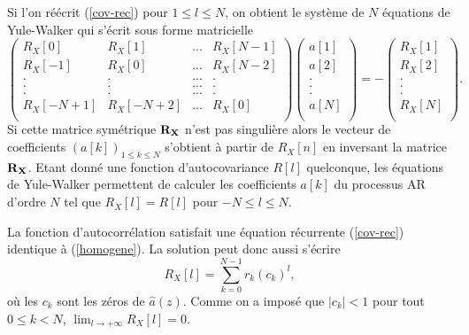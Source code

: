 Si l'on r\'e\'ecrit (\ref{cov-rec}) pour $ 1 \leq l \leq N$, on
obtient le syst\`eme de $N$ \'equations 
de Yule-Walker qui s'\'ecrit sous forme matricielle
\begin{equation}
\label{yule-walker}
\left( \begin{array}{cccc}
R_X[0] &R_X[1] & ...&R_X[N-1] \\
R_X[-1]&R_X[0]& ...&R_X[N-2]\\
. &. &...&.  \\
.&.&...&.\\
.&.&...&.\\
R_X[-N+1]&R_X[-N+2]&...&R_X[0]\\
\end{array}
\right)
\left( \begin{array}{c}
a[1]\\
a[2]\\
.\\
.\\
.\\
a[N]\\
\end{array}
\right)
= -
\left( \begin{array}{c}
R_X[1]\\
R_X[2]\\
.\\
.\\
.\\
R_X[N]\\
\end{array}
\right) .
\end{equation}
Si cette matrice sym\'etrique $\bf R_X$ n'est pas singuli\`ere 
alors
le vecteur de coefficients $(a[k])_{1 \leq k \leq N}$ 
s'obtient \`a partir de $R_X [n]$
en inversant la matrice $\bf R_X$.
Etant donn\'e une fonction d'autocovariance $R[l]$ quelconque,
les \'equations de Yule-Walker permettent de calculer les coefficients
$a[k]$ du processus AR d'ordre $N$ tel que $R_X [l] = R[l]$ pour 
$-N \leq l \leq N$. 

La fonction d'autocorr\'elation satisfait une \'equation
r\'ecurrente (\ref{cov-rec})
identique \`a (\ref{homogene}). La solution peut 
donc aussi s'\'ecrire
\[
R_X[l] = \sum_{k=0}^{N-1} r_k (c_k)^ l ,
\]
o\`u les $c_k$ sont les z\'eros de $\hat a (z)$.
Comme on a impos\'e que $|c_k| < 1$ pour tout $0 \leq k < N$,
$\lim _{l \rightarrow + \infty} R_X [l] = 0$.

